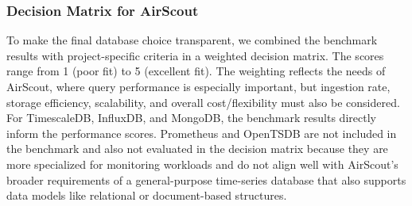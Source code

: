 \subsubsection{Decision Matrix for AirScout}

To make the final database choice transparent, we combined the benchmark
results with project-specific criteria in a weighted decision matrix. The
scores range from 1 (poor fit) to 5 (excellent fit). The weighting reflects the
needs of AirScout, where query performance is especially important, but
ingestion rate, storage efficiency, scalability, and overall cost/flexibility
must also be considered. For TimescaleDB, InfluxDB, and MongoDB, the benchmark
results directly inform the performance scores. Prometheus and OpenTSDB are not
included in the benchmark and also not evaluated in the decision matrix because
they are more specialized for monitoring workloads and do not align well with
AirScout's broader requirements of a general-purpose time-series database that
also supports data models like relational or document-based structures.

\begin{table}[ht!]
    \centering
    \scriptsize
    \caption{Weighted decision matrix for selecting a time-series database for AirScout. Scores are project-specific and use a scale from 1 (poor fit) to 5 (excellent fit).}\label{tab:airscout-decision-matrix}
\end{table}

